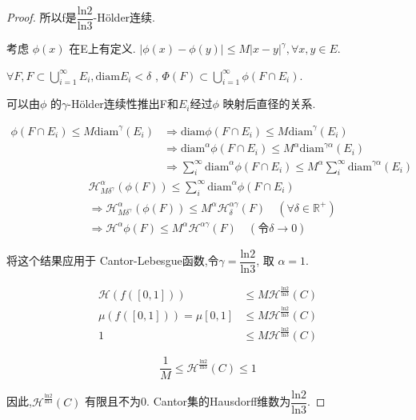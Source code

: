 \documentclass[hyperref,a4paper,UTF8]{ctexart}
\begin{document}
\begin{proof}
所以f是$\dfrac{\mathrm{ln}2}{\mathrm{ln}3}$-Hölder连续. 


考虑 $\phi (x)$ 在E上有定义. $\vert \phi (x) - \phi (y) \vert \leqslant M \vert x-y \vert^\gamma,\forall x,y \in E.$ 

$\forall F,F \subset \bigcup\limits_{i=1}^{\infty} E_i, \mathrm{diam}E_i<\delta $ ,
$\Phi(F) \subset \bigcup\limits_{i=1}^{\infty}\phi(F \cap E_i)$. 

可以由$\phi$ 的$\gamma$-Hölder连续性推出F和$E_i$经过$\phi$ 映射后直径的关系. 

\begin{align*}
\phi(F \cap E_i ) \leqslant M \mathrm{diam} ^\gamma (E_i )&\Rightarrow \mathrm{diam} \phi(F \cap E_i) \leqslant M \mathrm{diam} ^\gamma (E_i )\\
&\Rightarrow \mathrm{diam} ^\alpha \phi(F \cap E_i) \leqslant M^{\alpha} \mathrm{diam} ^{\gamma\alpha} (E_i )\\
&\Rightarrow \sum_i^{\infty}\mathrm{diam} ^\alpha \phi(F \cap E_i)\leqslant M^{\alpha} \sum_i^{\infty} \mathrm{diam} ^{\gamma\alpha} (E_i )
\end{align*}
\begin{align*}
&\mathcal{H}^\alpha_{M \delta^\gamma} (\phi(F)) \leqslant   \sum_i^{\infty}\mathrm{diam} ^\alpha \phi(F \cap E_i) \\
& \Rightarrow \mathcal{H}^\alpha_{M \delta^\gamma} (\phi(F)) \leqslant M^{\alpha} \mathcal{H}^{\alpha\gamma }_\delta(F) \quad (\forall \delta \in \mathbb{R}^{+})\\
& \Rightarrow \mathcal{H}^\alpha{\phi(F)} \leqslant M^{\alpha} \mathcal{H}^{\alpha\gamma }(F) \quad (令 \delta \rightarrow 0)
\end{align*}

将这个结果应用于 Cantor-Lebesgue函数,令$\gamma = \dfrac{\mathrm{ln}2}{\mathrm{ln}3}$,
取 $\alpha = 1$.


\begin{align*}
\mathcal{H}(f([0,1])) & \leqslant M \mathcal{H}^{\frac{ \mathrm{ln}2}{ \mathrm{ln}3}}(C)\\
\mu(f([0,1])) = \mu{[0,1]} & \leqslant M \mathcal{H}^{\frac{ \mathrm{ln}2}{ \mathrm{ln}3}}(C)\\
1 & \leqslant M \mathcal{H}^{\frac{ \mathrm{ln}2}{ \mathrm{ln}3}}(C)
\end{align*} 

\[
\frac{1}{M } \leqslant \mathcal{H}^{\frac{ \mathrm{ln}2}{ \mathrm{ln}3}}(C) \leqslant 1
\]

因此,$\mathcal{H}^{\frac{ \mathrm{ln}2}{ \mathrm{ln}3}}(C)$ 有限且不为0. Cantor集的Hausdorff维数为$\dfrac{\mathrm{ln}2}{\mathrm{ln}3}$.

\text{\textcolor{red}{tips:在前文中应该叙述清楚Hausdorff维数的定义和性质.}}
\end{proof}
\end{document}
